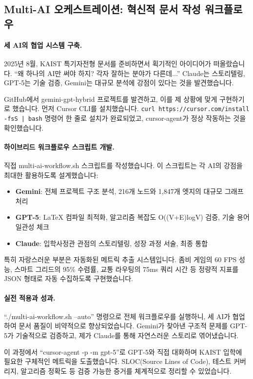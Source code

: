 \subsection{Multi-AI 오케스트레이션: 혁신적 문서 작성 워크플로우}

\paragraph{세 AI의 협업 시스템 구축.}
2025년 8월, KAIST 특기자전형 문서를 준비하면서 획기적인 아이디어가 떠올랐습니다. ``왜 하나의 AI만 써야 하지? 각자 잘하는 분야가 다른데...'' Claude는 스토리텔링, GPT-5는 기술 검증, Gemini는 대규모 분석에 강점이 있다는 것을 발견했습니다.

GitHub에서 gemini-gpt-hybrid 프로젝트를 발견하고, 이를 제 상황에 맞게 구현하기로 했습니다. 먼저 Cursor CLI를 설치했습니다. \texttt{curl https://cursor.com/install -fsS | bash} 명령어 한 줄로 설치가 완료되었고, cursor-agent가 정상 작동하는 것을 확인했습니다.

\paragraph{하이브리드 워크플로우 스크립트 개발.}
직접 multi-ai-workflow.sh 스크립트를 작성했습니다. 이 스크립트는 각 AI의 강점을 최대한 활용하도록 설계했습니다:

\begin{itemize}[leftmargin=*]
    \item \textbf{Gemini}: 전체 프로젝트 구조 분석, 216개 노드와 1,847개 엣지의 대규모 그래프 처리
    \item \textbf{GPT-5}: LaTeX 컴파일 최적화, 알고리즘 복잡도 O((V+E)logV) 검증, 기술 용어 일관성 체크
    \item \textbf{Claude}: 입학사정관 관점의 스토리텔링, 성장 과정 서술, 최종 통합
\end{itemize}

특히 자랑스러운 부분은 자동화된 메트릭 추출 시스템입니다. 좀비 게임의 60 FPS 성능, 스마트 그리드의 95\% 수렴률, 교통 라우팅의 75ms 쿼리 시간 등 정량적 지표를 JSON 형태로 자동 수집하도록 구현했습니다.

\paragraph{실전 적용과 성과.}
``./multi-ai-workflow.sh --auto'' 명령으로 전체 워크플로우를 실행하니, 세 AI가 협업하여 문서 품질이 비약적으로 향상되었습니다. Gemini가 찾아낸 구조적 문제를 GPT-5가 기술적으로 검증하고, 제가 Claude를 통해 자연스러운 스토리로 엮어냈습니다.

이 과정에서 ``cursor-agent -p -m gpt-5''로 GPT-5와 직접 대화하며 KAIST 입학에 필요한 구체적인 메트릭을 도출했습니다. SLOC(Source Lines of Code), 테스트 커버리지, 알고리즘 정확도 등 검증 가능한 증거를 체계적으로 정리할 수 있었습니다.

